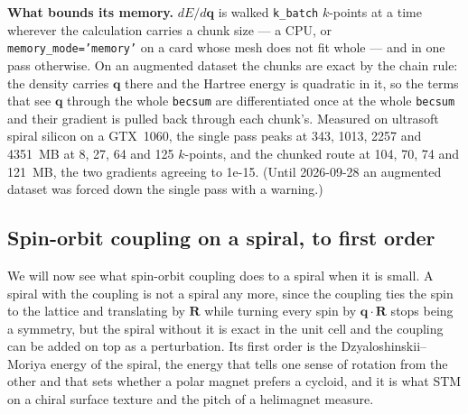 \documentclass[11pt,a4paper]{article}
\newcommand{\code}[1]{\texttt{\small #1}}
\begin{document}
\textbf{What bounds its memory.} $dE/d\mathbf q$ is walked \code{k\_batch}
$k$-points at a time wherever the calculation carries a chunk size --- a CPU, or
\code{memory\_mode='memory'} on a card whose mesh does not fit whole --- and in one
pass otherwise.
On an augmented dataset the chunks are exact by the chain rule: the density
carries $\mathbf q$ there and the Hartree energy is quadratic in it, so the
terms that see $\mathbf q$ through the whole \code{becsum} are differentiated
once at the whole \code{becsum} and their gradient is pulled back through each
chunk's. Measured on ultrasoft spiral silicon on a GTX~1060, the single pass
peaks at 343, 1013, 2257 and 4351~MB at 8, 27, 64 and 125 $k$-points, and the
chunked route at 104, 70, 74 and 121~MB, the two gradients agreeing to 1e-15.
(Until 2026-09-28 an augmented dataset was forced down the single pass with a
warning.)

\subsection{Spin-orbit coupling on a spiral, to first order}

We will now see what spin-orbit coupling does to a spiral when it is small. A
spiral with the coupling is not a spiral any more, since the coupling ties the
spin to the lattice and translating by $\mathbf R$ while turning every spin by
$\mathbf q\cdot\mathbf R$ stops being a symmetry, but the spiral without it is
exact in the unit cell and the coupling can be added on top as a perturbation.
Its first order is the Dzyaloshinskii--Moriya energy of the spiral, the energy
that tells one sense of rotation from the other and that sets whether a polar
magnet prefers a cycloid, and it is what STM on a chiral surface texture and
the pitch of a helimagnet measure.
\end{document}

